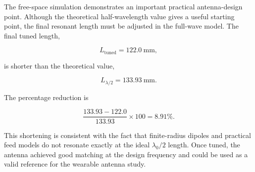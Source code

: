 The free-space simulation demonstrates an important practical antenna-design point. Although the theoretical half-wavelength value gives a useful starting point, the final resonant length must be adjusted in the full-wave model. The final tuned length,

\[
L_{\mathrm{tuned}} = 122.0~\mathrm{mm},
\]

is shorter than the theoretical value,

\[
L_{\lambda/2} = 133.93~\mathrm{mm}.
\]

The percentage reduction is

\[
\frac{133.93-122.0}{133.93}\times 100
=
8.91\%.
\]

This shortening is consistent with the fact that finite-radius dipoles and practical feed models do not resonate exactly at the ideal \(\lambda_0/2\) length. Once tuned, the antenna achieved good matching at the design frequency and could be used as a valid reference for the wearable antenna study.
